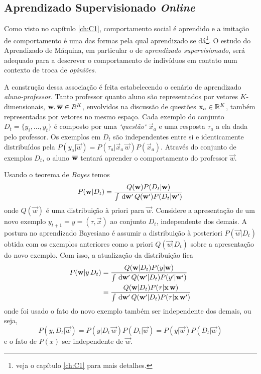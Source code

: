 \subsection{Aprendizado Supervisionado \emph{Online}}
\label{ssec:SOL}
Como visto no capítulo \ref{ch:C1}, comportamento social é aprendido e a imitação de comportamento é uma das formas pela qual aprendizado se dá\footnote{veja o capítulo \ref{ch:C1} para mais detalhes.}.
O estudo do Aprendizado de Máquina, em particular o de \emph{aprendizado supervisionado}, será adequado para a descrever o comportamento de indivíduos em contato num contexto de troca de \emph{opiniões}.

\newcommand{\Dt}{\ensuremath{D_t}} \newcommand{\rl}{\ensuremath{\vec{w}}}
\newcommand{\wt}{\ensuremath{\estv{w}}} \newcommand{\wT}{\ensuremath{\wt_+}}
A construção dessa associação é feita estabelecendo o cenário de aprendizado \emph{aluno-professor}.
Tanto professor quanto aluno são representados por vetores $K$-dimensionais, $\rl,\wt \in R^K$, envolvidos na discussão de questões $\mathbf{x}_a \in \mathbb{R}^K$, também representadas por vetores no mesmo espaço.
Cada exemplo do conjunto $\Dt = \{y_i,\dots,y_t\}$ é composto por uma \emph{`questão`} $\vec{x}_a$ e uma resposta $\tau_a$ a ela dada pelo professor.
Os exemplos em $D_t$ são independentes entre si e identicamente distribuídos pela $P(y_a|\rl)=P(\tau_a|\vec{x}_a\,\rl)P(\vec{x}_a)$.
Através do conjunto de exemplos $D_t$, o aluno $\wt$ tentará aprender o comportamento do professor $\rl$.

Usando o teorema de \emph{Bayes} temos \begin{equation}\label{eq:bayes}
  P(\rl|\Dt) = \frac{Q(\rl)P(\Dt|\rl)}
                    {\int \msr{\rl'} Q(\rl')P(\Dt|\rl')}
\end{equation}
onde $Q(\rl)$ é uma distribuição à priori para \rl.
Considere a apresentação de um novo exemplo $y_{t+1}=y=(\tau,\vec{x})$ ao conjunto $\Dt$, independente dos demais.
A postura no aprendizado Bayesiano é assumir a distribuição à posteriori $P(\rl|\Dt)$ obtida com os exemplos anteriores como a priori $Q(\rl|\Dt)$ sobre a apresentação do novo exemplo.
Com isso, a atualização da distribuição fica
\begin{align}\label{eq:bayes-update}
  P(\rl|y\,\Dt) & = \frac{Q(\rl|\Dt)P(y|\rl)}
       {\int \msr{\rl'} Q(\rl'|\Dt)P(y'|\rl')} \notag \\
  & = \frac{Q(\rl|\Dt)P(\tau|\vec{x}\,\rl)}
           {\int \msr{\rl'} Q(\rl'|\Dt)P(\tau|\vec{x}\,\rl')}
\end{align}
onde foi usado o fato do novo exemplo também ser independente dos demais, ou seja,
\[
P(y,\Dt|\rl) =
P(y|\Dt\,\rl)P(\Dt|\rl) =
P(y|\rl)P(\Dt|\rl)
\]
e o fato de $P(x)$ ser independente de $\rl$.

